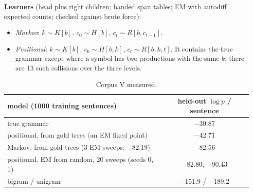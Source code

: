 \documentclass[11pt]{article}
\theoremstyle{definition}
\theoremstyle{remark}
\newcommand{\st}[1]{\textsf{\small\color{gray}#1}}
\begin{document}
\textbf{Learners} (head plus right children; banded span tables; EM with autodiff expected counts; checked against brute force):
\begin{itemize}
  \item \emph{Markov}: $k\sim K[b]$, $c_0\sim H[b]$, $c_t\sim R[b,c_{t-1}]$.
  \item \emph{Positional}: $k\sim K[b]$, $c_0\sim H[b,k]$, $c_t\sim R[b,k,t]$. It contains the true grammar except where a symbol has two productions with the same $k$; there are 13 such collisions over the three levels.
\end{itemize}
\begin{table}[!htbp]\centering\small
\begin{tabular}{lc}
\toprule
model (1000 training sentences) & held-out $\log p$ / sentence\\
\midrule
true grammar & $-30.87$\\
positional, from gold trees (an EM fixed point) & $-42.71$\\
Markov, from gold trees (3 EM sweeps: $-82.19$) & $-82.56$\\
positional, EM from random, 20 sweeps (seeds 0, 1) & $-82.80$, $-90.43$\\
bigram / unigram & $-151.9$ / $-189.2$\\
\bottomrule
\end{tabular}
\caption{Corpus V \st{measured}.}
\end{table}
\end{document}

